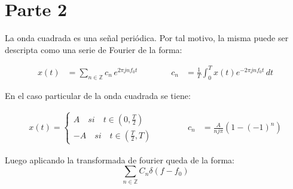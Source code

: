 \section{Parte 2}

La onda cuadrada es una señal periódica. Por tal motivo, la misma puede ser descripta como una serie de Fourier de la forma:

\begin{equation}
\begin{aligned}
x(t) &= \sum_{n\in\mathbb{Z}} c_n\, e^{2\pi j n f_0 t}
\qquad\qquad
c_n &= \frac{1}{T}\int_0^T x(t)e^{-2\pi j n f_0 t}\,dt
\end{aligned}
\end{equation}

En el caso particular de la onda cuadrada se tiene:

\begin{equation}
\begin{aligned}
x(t) = \left\{\begin{matrix}
 A\quad si \quad t \in (0,\frac{T}{2})\\-A\quad si \quad t \in (\frac{T}{2},T)
\end{matrix}\right. 
\qquad\qquad
c_n &= \frac{A}{nj\pi} (1-(-1)^n)
\end{aligned}
\label{eq:coeficientescuadrada}
\end{equation}

Luego aplicando la transformada de fourier queda de la forma:
\begin{equation}
\sum_{n\in \mathbb{Z}} C_n \delta(f-f_0)
\end{equation}

